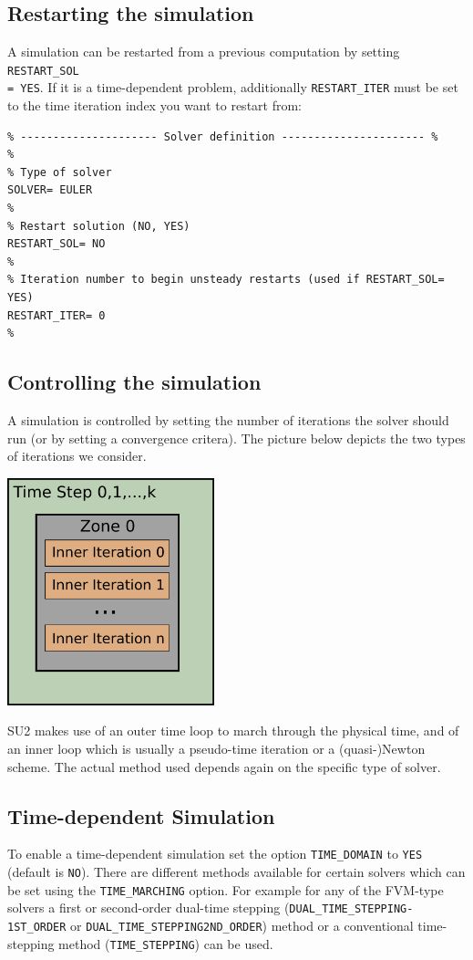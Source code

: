 \documentclass[12pt, a4paper, twoside]{article}
\begin{document}
\subsection{Restarting the simulation}
A simulation can be restarted from a previous computation by setting \texttt{RESTART\_SOL \\= YES}. If it is a time-dependent problem, additionally \verb|RESTART_ITER| must be set to the time iteration index you want to restart from: 

\begin{lstlisting}
% --------------------- Solver definition ---------------------- %
%
% Type of solver 
SOLVER= EULER
%
% Restart solution (NO, YES)
RESTART_SOL= NO
%
% Iteration number to begin unsteady restarts (used if RESTART_SOL= YES)
RESTART_ITER= 0
%

\end{lstlisting}

\newpage
\subsection{Controlling the simulation}
A simulation is controlled by setting the number of iterations the solver should run (or by setting a convergence critera). The picture below depicts the two types of iterations we consider.

\begin{center}
    \includegraphics[width=6cm]{Figures/unst_singlezone.png}
\end{center}

SU2 makes use of an outer time loop to march through the physical time, and of an inner loop which is usually a pseudo-time iteration or a (quasi-)Newton scheme. The actual method used depends again on the specific type of solver.

\subsection{Time-dependent Simulation}
To enable a time-dependent simulation set the option \verb|TIME_DOMAIN| to \verb|YES| (default is \verb|NO|). There are different methods available for certain solvers which can be set using the \verb|TIME_MARCHING| option. For example for any of the FVM-type solvers a first or second-order dual-time stepping (\texttt{DUAL\_TIME\_STEPPING-1ST\_ORDER} or \texttt{DUAL\_TIME\_STEPPING\-2ND\_ORDER}) method or a conventional time-stepping method (\verb|TIME_STEPPING|) can be used.
\end{document}
